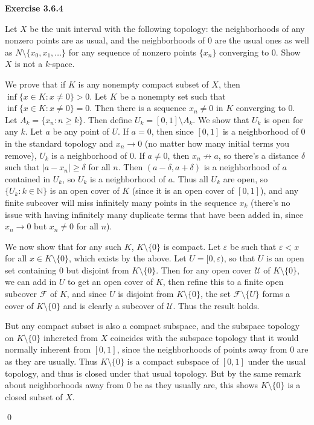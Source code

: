 \documentclass[12pt]{article}
\newcommand{\qcolor}{Gray}
\newcommand{\acolor}{Black}
\newcommand{\N}{\mathbb{N}}
\newcommand{\abs}[1]{\left|#1\right|}
\newcommand{\question}[1]{
	\color{\qcolor} 
	\item[#1~]}
\newcommand{\answer}[0]{
	\color{\acolor} 
	\item[]}
\newenvironment{exercise}[1]
{
	{
		\Large
		\color{\acolor}
		\addtolength\leftskip{-2em}
		\textbf{Exercise #1}
		
	}
	\begin{list}{}
	{
		\setlength\leftmargin{1em}
		\setlength\rightmargin{0em}
		\setlength\labelwidth{2em}
		\setlength\itemsep{0em}
		\setlength\parsep{0.5em}
		\setlength\baselineskip{1.25em}
	}
}
{
  \qed{}
  \end{list}
}
\begin{document}
\begin{exercise}{3.6.4}
  \question{} Let $X$ be the unit interval with the following topology: the neighborhoods of any nonzero points are as usual, and the neighborhoods of $0$ are the usual ones as well as $N \setminus \{ x_0, x_1, \ldots \}$ for any sequence of nonzero points $\{x_n\}$ converging to 0. Show $X$ is not a $k$-space. 
  \answer
  We prove that if $K$ is any nonempty compact subset of $X$, then $\inf \{ x \in K : x \neq 0 \} > 0$. Let $K$ be a nonempty set such that $\inf \{ x \in K : x \neq 0 \} = 0$. Then there is a sequence $x_n \neq 0$ in $K$ converging to $0$. Let $A_k = \{ x_n : n \geq k \}$. Then define $U_k = [0,1] \setminus A_k$. We show that $U_k$ is open for any $k$. Let $a$ be any point of $U$. If $a = 0$, then since $[0,1]$ is a neighborhood of $0$ in the standard topology and $x_n \to 0$ (no matter how many initial terms you remove), $U_k$ is a neighborhood of $0$. If $a \neq 0$, then $x_n \not \to a$, so there's a distance $\delta$ such that $\abs{a - x_n} \geq \delta$ for all $n$. Then $(a-\delta, a+\delta)$ is a neighborhood of $a$ contained in $U_k$, so $U_k$ is a neighborhood of $a$. Thus all $U_k$ are open, so $\{ U_k : k \in \N \}$ is an open cover of $K$ (since it is an open cover of $[0, 1]$), and any finite subcover will miss infinitely many points in the sequence $x_k$ (there's no issue with having infinitely many duplicate terms that have been added in, since $x_n \to 0$ but $x_n \neq 0$ for all $n$).

  We now show that for any such $K$, $K \setminus \{0\}$ is compact. Let $\varepsilon$ be such that $\varepsilon < x$ for all $x \in K \setminus \{0\}$, which exists by the above. Let $U = [0, \varepsilon)$, so that $U$ is an open set containing $0$ but disjoint from $K\setminus \{0\}$. Then for any open cover $\mathscr{U}$ of $K \setminus \{0\}$, we can add in $U$ to get an open cover of $K$, then refine this to a finite open subcover $\mathscr{F}$ of $K$, and since $U$ is disjoint from $K \setminus \{0\}$, the set $\mathscr{F} \setminus \{ U \}$ forms a cover of $K \setminus \{0\}$ and is clearly a subcover of $\mathscr{U}$. Thus the result holds.

  But any compact subset is also a compact subspace, and the subspace topology on $K \setminus \{0\}$ inhereted from $X$ coincides with the subspace topology that it would normally inherent from $[0, 1]$, since the neighborhoods of points away from $0$ are as they are usually. Thus $K\setminus \{0\}$ is a compact subspace of $[0,1]$ under the usual topology, and thus is closed under that usual topology. But by the same remark about neighborhoods away from $0$ be as they usually are, this shows $K \setminus \{0\}$ is a closed subset of $X$.


\end{exercise}
\end{document}
